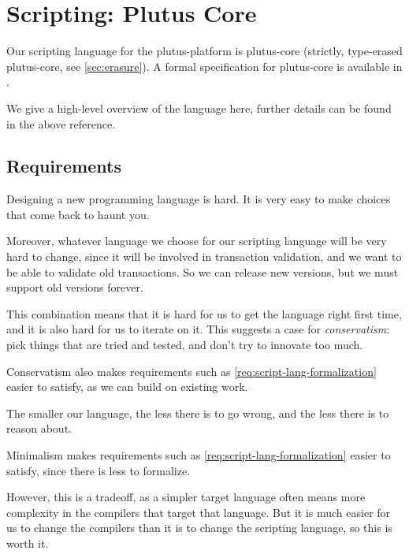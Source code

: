 \section{Scripting: Plutus Core}
\label{sec:plutus-core}

Our scripting language for the \gls{plutus-platform} is \gls{plutus-core} (strictly, type-erased \gls{plutus-core}, see \cref{sec:erasure}).
A formal specification for \gls{plutus-core} is available in \textcite{plutus-core-spec}.

We give a high-level overview of the language here, further details can be found in the above reference.

\subsection{Requirements}
\begin{requirement}[Conservatism]
\label{req:script-lang-conservatism}
Designing a new programming language is hard.
It is very easy to make choices that come back to haunt you.

Moreover, whatever language we choose for our scripting language will be very hard to change, since it will be involved in transaction validation, and we want to be able to validate old transactions.
So we can release new versions, but we must support old versions forever.

This combination means that it is hard for us to get the language right first time, and it is also hard for us to iterate on it.
This suggests a case for \emph{conservatism}: pick things that are tried and tested, and don't try to innovate too much.

Conservatism also makes requirements such as \cref{req:script-lang-formalization} easier to satisfy, as we can build on existing work.
\end{requirement}

\begin{requirement}[Minimalism]
\label{req:script-lang-minimalism}
The smaller our language, the less there is to go wrong, and the less there is to reason about.

Minimalism makes requirements such as \cref{req:script-lang-formalization} easier to satisfy, since there is less to formalize.

However, this is a tradeoff, as a simpler target language often means more complexity in the compilers that target that language.
But it is much easier for us to change the compilers than it is to change the scripting language, so this is worth it.
\end{requirement}

